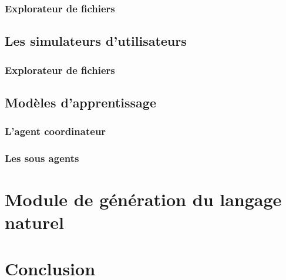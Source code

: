 		\subsubsection*{Explorateur de fichiers}
	\subsection{Les simulateurs d'utilisateurs}
		\subsubsection*{Explorateur de fichiers}
	\subsection{Modèles d'apprentissage}
		\subsubsection*{L'agent coordinateur}
		\subsubsection*{Les sous agents}

\section{Module de génération du langage naturel}
	
\section{Conclusion}	